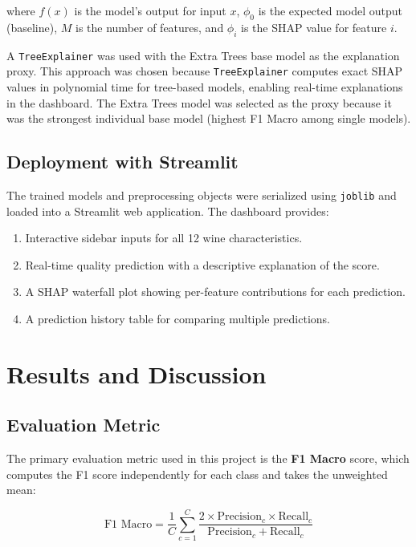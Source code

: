 \documentclass[12pt, a4paper]{article}
\begin{document}
where $f(x)$ is the model's output for input $x$, $\phi_0$ is the expected model output (baseline), $M$ is the number of features, and $\phi_i$ is the SHAP value for feature $i$.

A \texttt{TreeExplainer} was used with the Extra Trees base model as the explanation proxy. This approach was chosen because \texttt{TreeExplainer} computes exact SHAP values in polynomial time for tree-based models, enabling real-time explanations in the dashboard. The Extra Trees model was selected as the proxy because it was the strongest individual base model (highest F1 Macro among single models).

\subsection{Deployment with Streamlit}

The trained models and preprocessing objects were serialized using \texttt{joblib} and loaded into a Streamlit web application. The dashboard provides:

\begin{enumerate}
    \item Interactive sidebar inputs for all 12 wine characteristics.
    \item Real-time quality prediction with a descriptive explanation of the score.
    \item A SHAP waterfall plot showing per-feature contributions for each prediction.
    \item A prediction history table for comparing multiple predictions.
\end{enumerate}

\section{Results and Discussion}

\subsection{Evaluation Metric}

The primary evaluation metric used in this project is the \textbf{F1 Macro} score, which computes the F1 score independently for each class and takes the unweighted mean:

\begin{equation}
\text{F1 Macro} = \frac{1}{C} \sum_{c=1}^{C} \frac{2 \times \text{Precision}_c \times \text{Recall}_c}{\text{Precision}_c + \text{Recall}_c}
\label{eq:f1macro}
\end{equation}
\end{document}

